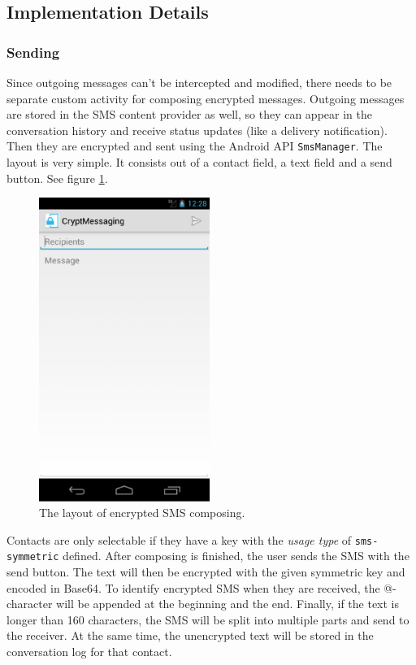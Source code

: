 \documentclass[a4paper,draft]{scrartcl}
\begin{document}
	\subsection{Implementation Details}
		\subsubsection{Sending}
			Since outgoing messages can't be intercepted and modified, there needs to be separate custom activity for composing	encrypted messages. Outgoing messages are stored in the SMS content provider as well, so they can appear in the conversation history and receive status updates (like a delivery notification). Then they are encrypted and sent using the Android API
	\texttt{SmsManager}. The layout is very simple. It consists out of a contact field, a text field and a send button. See figure \ref{fig:compose}.
			\begin{figure}[h]
				\centering
					\includegraphics[width=15em]{crypt-compose}
				\caption{The layout of encrypted SMS composing.}
				\label{fig:compose}
			\end{figure}

			Contacts are only selectable if they have a key with the {\em usage type} of \texttt{sms-symmetric} defined. After composing is finished, the user sends the SMS with the send button. The text will then be encrypted with the given symmetric key and encoded in Base64. To identify encrypted SMS when they are received, the @-character will be appended at the beginning and the end.
			Finally, if the text is longer than 160 characters, the SMS will be split into multiple parts and send to the receiver. At the same time, the unencrypted text will be stored in the conversation log for that contact.
\end{document}
